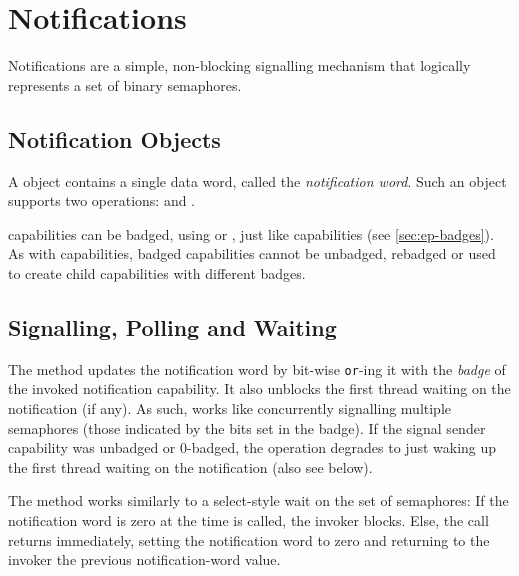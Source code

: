 %
%
%
%

\chapter{\label{ch:notifications}Notifications}

Notifications are a simple, non-blocking signalling mechanism that
logically represents a set of binary semaphores.

\section{Notification Objects}

A  object contains a single data word, called the
\emph{notification word}. Such an object supports two operations:
 and
.

 capabilities can be badged, using
 or
, just like 
capabilities (see \autoref{sec:ep-badges}). As with 
capabilities, badged  capabilities cannot be
  unbadged, rebadged or used to create child capabilities with
  different badges. \label{s:notif-badge}

\section{Signalling, Polling and Waiting}

The  method updates the
notification word by bit-wise \texttt{or}-ing it with the \emph{badge}
of the invoked notification capability. It also unblocks the first
thread waiting on the notification (if any). As such,
 works like concurrently signalling
multiple semaphores (those indicated by the bits set in the badge).
If the signal sender capability was unbadged or 0-badged, the operation degrades
to just waking up the first thread waiting on the notification (also see below).

The  method works similarly to a
select-style wait on the set of semaphores: If the notification word is
zero at the time  is called, the
invoker blocks. Else, the call returns immediately, setting the
notification word to zero and returning to the invoker the previous
notification-word value.

